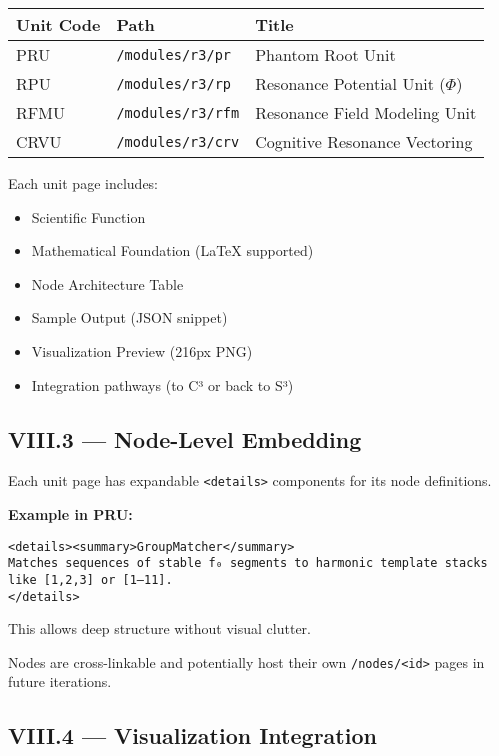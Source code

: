 \documentclass{article}
\begin{document}
\begin{center}
\begin{tabular}{|l|l|l|}
\hline
\textbf{Unit Code} & \textbf{Path} & \textbf{Title} \\
\hline
PRU & \texttt{/modules/r3/pr} & Phantom Root Unit \\
RPU & \texttt{/modules/r3/rp} & Resonance Potential Unit ($\Phi$) \\
RFMU & \texttt{/modules/r3/rfm} & Resonance Field Modeling Unit \\
CRVU & \texttt{/modules/r3/crv} & Cognitive Resonance Vectoring \\
\hline
\end{tabular}
\end{center}

Each unit page includes:

\begin{itemize}
    \item Scientific Function
    \item Mathematical Foundation (LaTeX supported)
    \item Node Architecture Table
    \item Sample Output (JSON snippet)
    \item Visualization Preview (216px PNG)
    \item Integration pathways (to C³ or back to S³)
\end{itemize}

\subsection*{VIII.3 — Node-Level Embedding}

Each unit page has expandable \texttt{<details>} components for its node definitions.

\textbf{Example in PRU:}

\begin{verbatim}
<details><summary>GroupMatcher</summary>
Matches sequences of stable f₀ segments to harmonic template stacks like [1,2,3] or [1–11].
</details>
\end{verbatim}

This allows deep structure without visual clutter.

Nodes are cross-linkable and potentially host their own \texttt{/nodes/<id>} pages in future iterations.

\subsection*{VIII.4 — Visualization Integration}
\end{document}

